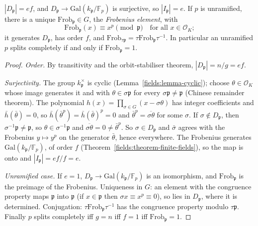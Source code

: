 \begin{theorem}\label{algebraic-number-theory:theorem-frobenius}
$|D_\mathfrak{p}| = ef$, and $D_\mathfrak{p} \to \mathrm{Gal}(k_\mathfrak{p}/\mathbb{F}_p)$ is surjective, so $|I_\mathfrak{p}| = e$. If $p$ is unramified, there is a unique $\mathrm{Frob}_\mathfrak{p} \in G$, the
\emph{Frobenius element}, with
\[
\mathrm{Frob}_\mathfrak{p}(x) \equiv x^p \pmod{\mathfrak{p}} \quad \text{for all } x \in \mathcal{O}_K;
\]
it generates $D_\mathfrak{p}$, has order $f$, and $\mathrm{Frob}_{\tau\mathfrak{p}} = \tau\mathrm{Frob}_\mathfrak{p}\tau^{-1}$. In particular an unramified $p$ splits completely if and only if $\mathrm{Frob}_\mathfrak{p} = 1$.
\end{theorem}

\begin{proof}
\emph{Order.} By transitivity and the orbit-stabiliser theorem, $|D_\mathfrak{p}| = n/g = ef$.

\emph{Surjectivity.} The group $k_\mathfrak{p}^\times$ is cyclic (Lemma~\ref{fields:lemma-cyclic}); choose $\theta \in \mathcal{O}_K$ whose image generates it and with $\theta \in \sigma\mathfrak{p}$ for every
$\sigma\mathfrak{p} \neq \mathfrak{p}$ (Chinese remainder theorem). The polynomial $h(x) = \prod_{\sigma \in G}(x - \sigma\theta)$ has integer coefficients and $\bar h(\bar\theta) = 0$, so $\bar h(\bar\theta^p) = \bar h(\bar\theta)^p = 0$
and $\bar\theta^p = \overline{\sigma\theta}$ for some $\sigma$. If $\sigma \notin D_\mathfrak{p}$, then $\sigma^{-1}\mathfrak{p} \neq \mathfrak{p}$, so $\theta \in \sigma^{-1}\mathfrak{p}$ and $\overline{\sigma\theta} = 0 \neq \bar\theta^p$. So
$\sigma \in D_\mathfrak{p}$ and $\bar\sigma$ agrees with the Frobenius $y \mapsto y^p$ on the generator $\bar\theta$, hence everywhere. The Frobenius generates $\mathrm{Gal}(k_\mathfrak{p}/\mathbb{F}_p)$, of order $f$
(Theorem~\ref{fields:theorem-finite-fields}), so the map is onto and $|I_\mathfrak{p}| = ef/f = e$.

\emph{Unramified case.} If $e = 1$, $D_\mathfrak{p} \to \mathrm{Gal}(k_\mathfrak{p}/\mathbb{F}_p)$ is an isomorphism, and $\mathrm{Frob}_\mathfrak{p}$ is the preimage of the Frobenius. Uniqueness in $G$: an element with the
congruence property maps $\mathfrak{p}$ into $\mathfrak{p}$ (if $x \in \mathfrak{p}$ then $\sigma x \equiv x^p \equiv 0$), so lies in $D_\mathfrak{p}$, where it is determined. Conjugation: $\tau\mathrm{Frob}_\mathfrak{p}\tau^{-1}$
has the congruence property modulo $\tau\mathfrak{p}$. Finally $p$ splits completely iff $g = n$ iff $f = 1$ iff $\mathrm{Frob}_\mathfrak{p} = 1$.
\end{proof}

